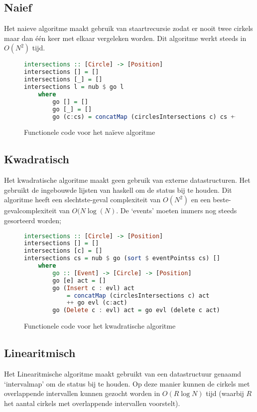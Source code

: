\newpage
\subsection{Naief}
Het naieve algoritme maakt gebruik van staartrecursie zodat er nooit twee cirkels maar dan \'e\'en keer met elkaar vergeleken worden. Dit algoritme werkt steeds in $O(N^2)$ tijd.

\begin{figure}[H]
\begin{lstlisting}[language=Haskell]
intersections :: [Circle] -> [Position]
intersections [] = []
intersections [_] = []
intersections l = nub $ go l
    where
        go [] = []
        go [_] = []
        go (c:cs) = concatMap (circlesIntersections c) cs ++ go cs
\end{lstlisting}
\label{imp:naive}
\caption{Functionele code voor het na\"ieve algoritme}
\end{figure}


\subsection{Kwadratisch}
Het kwadratische algoritme maakt geen gebruik van externe datastructuren. Het gebruikt de ingebouwde lijsten van haskell om de status bij te houden. Dit algoritme heeft een slechtste-geval complexiteit van $O(N^2)$ en een beste-gevalcomplexiteit van $O(N\log(N)$. De `events' moeten immers nog steeds gesorteerd worden;

\begin{figure}[H]
\begin{lstlisting}[language=Haskell]
intersections :: [Circle] -> [Position]
intersections [] = []
intersections [c] = []
intersections cs = nub $ go (sort $ eventPointss cs) []
    where
        go :: [Event] -> [Circle] -> [Position]
        go [e] act = []
        go (Insert c : evl) act 
        	= concatMap (circlesIntersections c) act 
        	++ go evl (c:act)
        go (Delete c : evl) act = go evl (delete c act)
\end{lstlisting}
\label{imp:quadratic}
\caption{Functionele code voor het kwadratische algoritme}
\end{figure}

\newpage
\subsection{Linearitmisch}
Het Linearitmische algoritme maakt gebruikt van een datastructuur genaamd `intervalmap' om de status bij te houden.
Op deze manier kunnen de cirkels met overlappende intervallen kunnen gezocht worden in $O(R\log N)$ tijd (waarbij $R$ het aantal cirkels met overlappende intervallen voorstelt).

